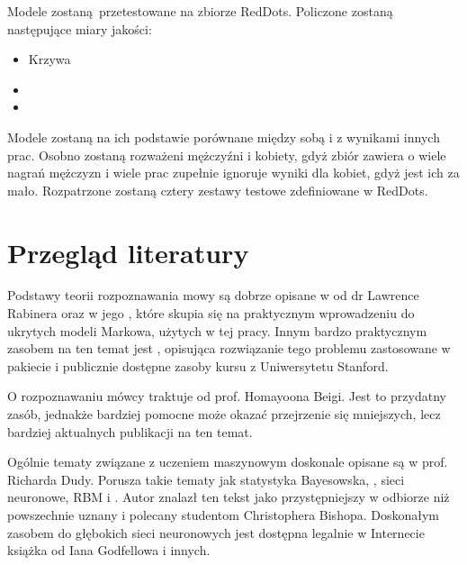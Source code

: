 Modele zostaną przetestowane na zbiorze RedDots. Policzone zostaną następujące miary jakości:

\begin{itemize}
    \item Krzywa 
    \item {}
    \item {}
\end{itemize}

Modele zostaną na ich podstawie porównane między sobą i z wynikami innych prac. Osobno zostaną rozważeni mężczyźni 
i kobiety, gdyż zbiór zawiera o wiele nagrań mężczyzn i wiele prac zupełnie ignoruje wyniki dla kobiet, 
gdyż jest ich za mało. Rozpatrzone zostaną cztery zestawy testowe zdefiniowane w RedDots.

\section{Przegląd literatury}\label{sec:przeglad_literatury}

Podstawy teorii rozpoznawania mowy są dobrze opisane w \cite{fundamentalsOfSpeech}
od dr Lawrence Rabinera oraz w jego 
\cite{aTutorialOnHidden}, które
skupia się na praktycznym wprowadzeniu do ukrytych modeli Markowa, użytych w tej pracy.
Innym bardzo praktycznym zasobem na ten temat jest \cite{theHtkBook}, opisująca rozwiązanie
tego problemu zastosowane w pakiecie  i publicznie dostępne zasoby
kursu  z Uniwersytetu Stanford.

O rozpoznawaniu mówcy traktuje  od prof. Homayoona Beigi.
Jest to przydatny zasób, jednakże bardziej pomocne może okazać przejrzenie się mniejszych, lecz
bardziej aktualnych publikacji na ten temat.

Ogólnie tematy związane z uczeniem maszynowym doskonale opisane są w 
\cite{patternClassification} prof. Richarda Dudy.
Porusza takie tematy jak statystyka Bayesowska, , sieci neuronowe, RBM 
i . Autor znalazł ten tekst jako przystępniejszy w odbiorze niż powszechnie 
uznany i polecany studentom  Christophera Bishopa. 
Doskonałym zasobem do głębokich sieci neuronowych jest dostępna legalnie w Internecie książka 
\cite{deeplearningbook} od Iana Godfellowa i innych.

